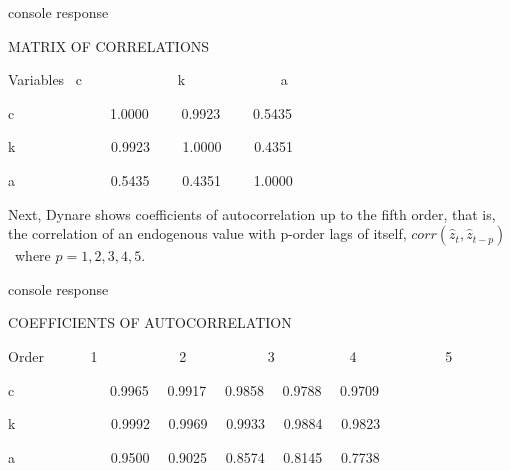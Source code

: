 \documentclass[a4paper,12pt]{article}%
\begin{document}
\vspace{3ex}
\begin{myresult}{console response}%


\textsf{MATRIX OF CORRELATIONS}

\textsf{%
\vspace{3ex}%
}

\textsf{Variables \ c \ \ \ \ \ \ \ \ \ \ \ \ \ k \ \ \ \ \ \ \ \ \ \ \ \ \ a}

\textsf{c \ \ \ \ \ \ \ \ \ \ \ \ \ 1.0000 \ \ \ \ 0.9923 \ \ \ \ 0.5435}

\textsf{k \ \ \ \ \ \ \ \ \ \ \ \ \ 0.9923 \ \ \ \ 1.0000 \ \ \ \ 0.4351}

\textsf{a \ \ \ \ \ \ \ \ \ \ \ \ \ 0.5435 \ \ \ \ 0.4351 \ \ \ \ 1.0000}%

\end{myresult}
\vspace{3ex}%


Next, Dynare shows coefficients of autocorrelation up to the fifth order, that
is, the correlation of an endogenous value with p-order lags of itself,
$corr(\hat{z}_{t},\hat{z}_{t-p})$\ where $p=1,2,3,4,5$.%

\vspace{3ex}
\begin{myresult}{console response}%


\textsf{COEFFICIENTS OF AUTOCORRELATION}

\textsf{%
\vspace{3ex}%
}

\textsf{Order \ \ \ \ \ \ 1 \ \ \ \ \ \ \ \ \ \ \ 2 \ \ \ \ \ \ \ \ \ \ \ 3
\ \ \ \ \ \ \ \ \ \ 4 \ \ \ \ \ \ \ \ \ \ \ \ 5}

\textsf{c \ \ \ \ \ \ \ \ \ \ \ \ \ 0.9965 \ \ 0.9917 \ \ 0.9858 \ \ 0.9788
\ \ 0.9709}

\textsf{k \ \ \ \ \ \ \ \ \ \ \ \ \ 0.9992 \ \ 0.9969 \ \ 0.9933 \ \ 0.9884
\ \ 0.9823}

\textsf{a \ \ \ \ \ \ \ \ \ \ \ \ \ 0.9500 \ \ 0.9025 \ \ 0.8574 \ \ 0.8145
\ \ 0.7738}%

\end{myresult}
\vspace{3ex}%
\end{document}
